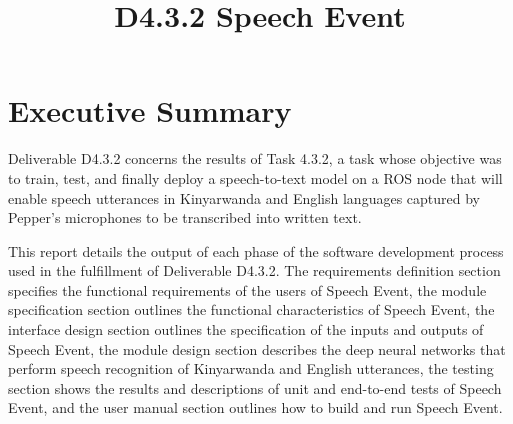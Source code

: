 \documentclass{CSSRforAfrica}
\begin{document}



\title{D4.3.2 Speech Event}    %





\maketitle
 

\section*{Executive Summary}
\label{executive_summary}

Deliverable D4.3.2 concerns the results of Task 4.3.2, a task whose objective was to train, test, and finally deploy a speech-to-text model on a ROS node that will enable speech utterances in Kinyarwanda and English languages captured by Pepper's microphones to be transcribed into written text.

This report details the output of each phase of the software development process used in the fulfillment of Deliverable D4.3.2. The requirements definition section specifies the functional requirements of the users of Speech Event, the module specification section outlines the functional characteristics of Speech Event, the interface design section outlines the specification of the inputs and outputs of Speech Event, the module design section describes the deep neural networks that perform speech recognition of Kinyarwanda and English utterances, the testing section shows the results and descriptions of unit and end-to-end tests of Speech Event, and the user manual section outlines how to build and run Speech Event.
\end{document}
